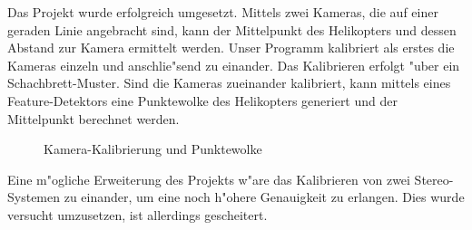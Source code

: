 \noindent Das Projekt wurde erfolgreich umgesetzt.
Mittels zwei Kameras, die auf einer geraden Linie angebracht sind, kann der Mittelpunkt des Helikopters und dessen Abstand zur Kamera ermittelt werden.\newline
Unser Programm kalibriert als erstes die Kameras einzeln und anschlie"send zu einander. Das Kalibrieren erfolgt "uber ein Schachbrett-Muster. Sind die Kameras zueinander kalibriert, kann mittels eines Feature-Detektors eine Punktewolke des Helikopters generiert und der Mittelpunkt berechnet werden.

\begin{figure}%
	\centering
	\qquad
	\caption{Kamera-Kalibrierung und Punktewolke}%
	\label{fig:example}%
\end{figure}
\noindent Eine m"ogliche Erweiterung des Projekts w"are das Kalibrieren von zwei Stereo-Systemen zu einander, um eine noch h"ohere Genauigkeit zu erlangen. Dies wurde versucht umzusetzen, ist allerdings gescheitert.

